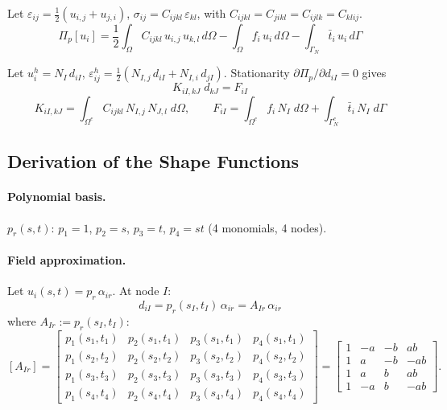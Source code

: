 \documentclass[11pt, a4paper]{article}
\begin{document}
Let $\varepsilon_{ij}=\tfrac{1}{2}(u_{i,j}+u_{j,i})$, $\sigma_{ij}=C_{ijkl}\,\varepsilon_{kl}$, with $C_{ijkl}=C_{jikl}=C_{ijlk}=C_{klij}$.
\begin{equation}\label{eq:pi2d}
\Pi_p[u_i]=\frac{1}{2}\int_\Omega C_{ijkl}\,u_{i,j}\,u_{k,l}\,d\Omega
-\int_\Omega f_i\,u_i\,d\Omega
-\int_{\Gamma_N}\!\bar{t}_i\,u_i\,d\Gamma
\end{equation}

Let $u_i^h=N_I\,d_{iI}$, $\varepsilon_{ij}^h=\tfrac{1}{2}(N_{I,j}\,d_{iI}+N_{I,i}\,d_{jI})$.  Stationarity $\partial\Pi_p/\partial d_{iI}=0$ gives
\begin{equation}\label{eq:elem_eq}
K_{iI,kJ}\;d_{kJ}=F_{iI}
\end{equation}
\begin{equation}\label{eq:KF2d}
K_{iI,kJ}=\int_{\Omega^e}C_{ijkl}\,N_{I,j}\,N_{J,l}\;d\Omega,\qquad
F_{iI}=\int_{\Omega^e}f_i\,N_I\;d\Omega+\int_{\Gamma_N^e}\bar{t}_i\,N_I\;d\Gamma
\end{equation}

\subsection{Derivation of the Shape Functions}

\paragraph{Polynomial basis.}
$p_r(s,t)$: $p_1=1$, $p_2=s$, $p_3=t$, $p_4=st$ (4 monomials, 4 nodes).

\paragraph{Field approximation.}
Let $u_i(s,t)=p_r\,\alpha_{ir}$.  At node $I$:
\[
d_{iI}=p_r(s_I,t_I)\,\alpha_{ir}=A_{Ir}\,\alpha_{ir}
\]
where $A_{Ir}:=p_r(s_I,t_I)$:
\begin{equation}\label{eq:Amat}
[A_{Ir}]=
\begin{bmatrix}
p_1(s_1,t_1) & p_2(s_1,t_1) & p_3(s_1,t_1) & p_4(s_1,t_1)\\
p_1(s_2,t_2) & p_2(s_2,t_2) & p_3(s_2,t_2) & p_4(s_2,t_2)\\
p_1(s_3,t_3) & p_2(s_3,t_3) & p_3(s_3,t_3) & p_4(s_3,t_3)\\
p_1(s_4,t_4) & p_2(s_4,t_4) & p_3(s_4,t_4) & p_4(s_4,t_4)
\end{bmatrix}
=
\begin{bmatrix}
1 & -a & -b &  ab\\
1 &  a & -b & -ab\\
1 &  a &  b &  ab\\
1 & -a &  b & -ab
\end{bmatrix}.
\end{equation}
\end{document}
